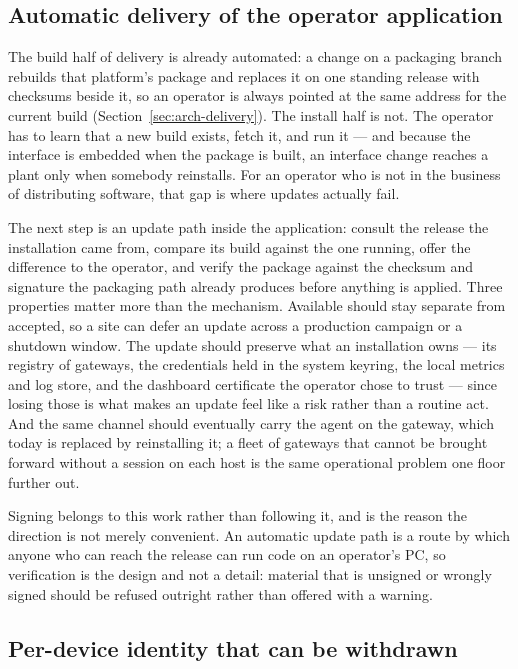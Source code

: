 \documentclass[12pt,a4paper]{report}
\begin{document}
\subsection{Automatic delivery of the operator application}

The build half of delivery is already automated: a change on
a packaging branch rebuilds that platform's package and
replaces it on one standing release with checksums beside it,
so an operator is always pointed at the same address for the
current build (Section~\ref{sec:arch-delivery}). The install
half is not. The operator has to
learn that a new build exists, fetch it, and run it --- and
because the interface is embedded when the package is built,
an interface change reaches a plant only when somebody
reinstalls. For an operator who is not in the business of
distributing software, that gap is where updates actually
fail.

The next step is an update path inside the application:
consult the release the installation came from, compare its
build against the one running, offer the difference to the
operator, and verify the package against the checksum and
signature the packaging path already produces before anything
is applied. Three properties matter more than the mechanism.
Available should stay separate from accepted, so a site can
defer an update across a production campaign or a shutdown
window. The update should preserve what an installation owns
--- its registry of gateways, the credentials held in the
system keyring, the local metrics and log store, and the
dashboard certificate the operator chose to trust --- since
losing those is what makes an update feel like a risk rather
than a routine act. And the same channel should eventually
carry the agent on the gateway, which today is replaced by
reinstalling it; a fleet of gateways that cannot be brought
forward without a session on each host is the same
operational problem one floor further out.

Signing belongs to this work rather than following it, and is
the reason the direction is not merely convenient. An
automatic update path is a route by which anyone who can
reach the release can run code on an operator's PC, so
verification is the design and not a detail: material that
is unsigned or wrongly signed should be refused outright
rather than offered with a warning.

\subsection{Per-device identity that can be withdrawn}
\end{document}
